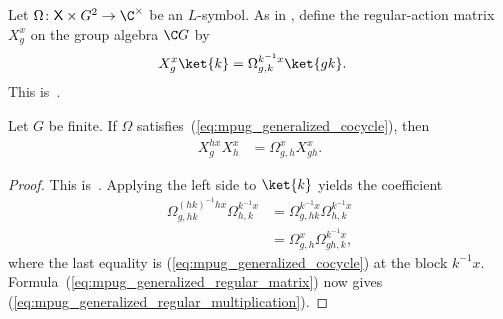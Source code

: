 \begin{definition}
    \label{def:mpug_generalized_regular_matrices}
    \leanok
    Let $\Omega\colon\mathsf X\times G^2\to\C^\times$ be an $L$-symbol.
    As in \cite[Lemma~\texttt{lemma:G\_cocycle}]{FrancoRubio2025MPUGauging},
    define the regular-action matrix $X^x_g$ on the group algebra $\C G$ by
    \begin{align}
        X^x_g\ket{k}
         & =\Omega^{k^{-1}x}_{g,k}\ket{gk}.
        \label{eq:mpug_generalized_regular_matrix}
    \end{align}
    This is~\cite[``Regular-action matrices'']{QICLean2026Blueprint}.
\end{definition}

\begin{lemma}
    \label{thm:mpug_generalized_regular_multiplication}
    \leanok
    Let $G$ be finite. If $\Omega$
    satisfies~(\ref{eq:mpug_generalized_cocycle}), then
    \begin{align}
        X^{h x}_gX^x_h
         & =\Omega^x_{g,h}X^x_{gh}.
        \label{eq:mpug_generalized_regular_multiplication}
    \end{align}
\end{lemma}

\begin{proof}\leanok
    This is~\cite[``Generalized projective multiplication
        law'']{QICLean2026Blueprint}.
    Applying the left side to $\ket{k}$ yields the coefficient
    \begin{align}
        \Omega^{(hk)^{-1}h x}_{g,hk}\Omega^{k^{-1}x}_{h,k}
         & =\Omega^{k^{-1}x}_{g,hk}\Omega^{k^{-1}x}_{h,k} \\
         & =\Omega^x_{g,h}\Omega^{k^{-1}x}_{gh,k},
    \end{align}
    where the last equality is
    (\ref{eq:mpug_generalized_cocycle}) at the block $k^{-1}x$.
    Formula~(\ref{eq:mpug_generalized_regular_matrix}) now gives
    (\ref{eq:mpug_generalized_regular_multiplication}).
\end{proof}

